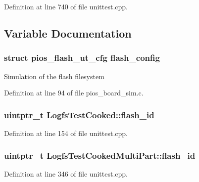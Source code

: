 \-Definition at line 740 of file unittest.\-cpp.



\subsection{\-Variable \-Documentation}
\hypertarget{group___unit_tests_gad0a2e88bcf286c1d92cc71ae4f2f4030}{
\subsubsection[{flash\-\_\-config}]{\setlength{\rightskip}{0pt plus 5cm}struct {\bf pios\-\_\-flash\-\_\-ut\-\_\-cfg} {\bf flash\-\_\-config}}}\label{group___unit_tests_gad0a2e88bcf286c1d92cc71ae4f2f4030}
\-Simulation of the flash filesystem 

\-Definition at line 94 of file pios\-\_\-board\-\_\-sim.\-c.

\hypertarget{group___unit_tests_ga1180d0088fd85cca978eaed59163f626}{
\subsubsection[{flash\-\_\-id}]{\setlength{\rightskip}{0pt plus 5cm}uintptr\-\_\-t {\bf \-Logfs\-Test\-Cooked\-::flash\-\_\-id}}}\label{group___unit_tests_ga1180d0088fd85cca978eaed59163f626}


\-Definition at line 154 of file unittest.\-cpp.

\hypertarget{group___unit_tests_ga503c4ee9ad8abab85d6fb34d0397944c}{
\subsubsection[{flash\-\_\-id}]{\setlength{\rightskip}{0pt plus 5cm}uintptr\-\_\-t {\bf \-Logfs\-Test\-Cooked\-Multi\-Part\-::flash\-\_\-id}}}\label{group___unit_tests_ga503c4ee9ad8abab85d6fb34d0397944c}


\-Definition at line 346 of file unittest.\-cpp.

